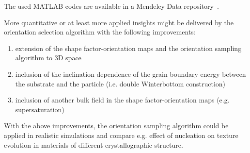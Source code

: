 The used MATLAB codes are available in a Mendeley Data repository~\cite{Minar2023dataset}.

More quantitative or at least more applied insights might be delivered by the orientation selection algorithm with the following improvements:

\begin{enumerate}
	\item extension of the shape factor-orientation maps and the orientation sampling algorithm to 3D space
	\item inclusion of the inclination dependence of the grain boundary energy between the substrate and the particle (i.e. double Winterbottom construction)
	\item inclusion of another bulk field in the shape factor-orientation maps (e.g. supersaturation)
\end{enumerate}

With the above improvements, the orientation sampling algorithm could be applied in realistic simulations and compare e.g. effect of nucleation on texture evolution in materials of different crystallographic structure. 
 


\cleardoublepage

